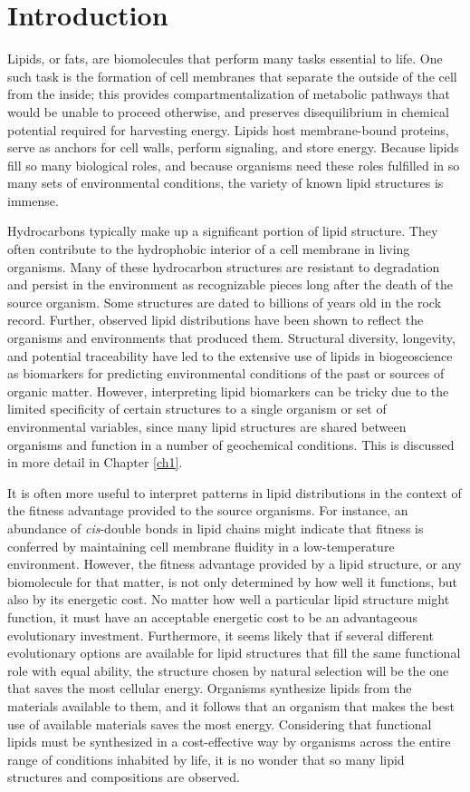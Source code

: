 \chapter[INTRODUCTION]{Introduction}


Lipids, or fats, are biomolecules that perform many tasks essential to life. One such task is the formation of cell membranes that separate the outside of the cell from the inside; this provides compartmentalization of metabolic pathways that would be unable to proceed otherwise, and preserves disequilibrium in chemical potential required for harvesting energy. Lipids host membrane-bound proteins, serve as anchors for cell walls, perform signaling, and store energy. Because lipids fill so many biological roles, and because organisms need these roles fulfilled in so many sets of environmental conditions, the variety of known lipid structures is immense.

Hydrocarbons typically make up a significant portion of lipid structure. They often contribute to the hydrophobic interior of a cell membrane in living organisms. Many of these hydrocarbon structures are resistant to degradation and persist in the environment as recognizable pieces long after the death of the source organism. Some structures are dated to billions of years old in the rock record. Further, observed lipid distributions have been shown to reflect the organisms and environments that produced them. Structural diversity, longevity, and potential traceability have led to the extensive use of lipids in biogeoscience as biomarkers for predicting environmental conditions of the past or sources of organic matter. However, interpreting lipid biomarkers can be tricky due to the limited specificity of certain structures to a single organism or set of environmental variables, since many lipid structures are shared between organisms and function in a number of geochemical conditions. This is discussed in more detail in Chapter \ref{ch1}.

It is often more useful to interpret patterns in lipid distributions in the context of the fitness advantage provided to the source organisms. For instance, an abundance of \textit{cis}-double bonds in lipid chains might indicate that fitness is conferred by maintaining cell membrane fluidity in a low-temperature environment. However, the fitness advantage provided by a lipid structure, or any biomolecule for that matter, is not only determined by how well it functions, but also by its energetic cost. No matter how well a particular lipid structure might function, it must have an acceptable energetic cost to be an advantageous evolutionary investment. Furthermore, it seems likely that if several different evolutionary options are available for lipid structures that fill the same functional role with equal ability, the structure chosen by natural selection will be the one that saves the most cellular energy. Organisms synthesize lipids from the materials available to them, and it follows that an organism that makes the best use of available materials saves the most energy. Considering that functional lipids must be synthesized in a cost-effective way by organisms across the entire range of conditions inhabited by life, it is no wonder that so many lipid structures and compositions are observed. 

